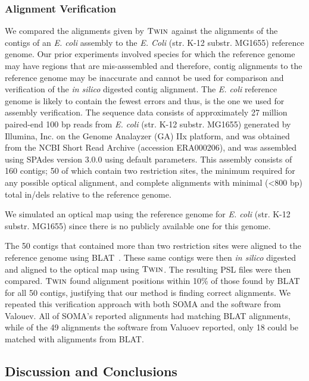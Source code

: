 \subsubsection{Alignment Verification}
\label{sec:ecoli-twin}

We compared the alignments given by $\mbox{\rm \textsc{Twin}}$ against the alignments of the contigs of an \emph{E. coli} assembly to the \emph{E. Coli} (str. K-12 substr. MG1655) reference genome.  Our prior experiments involved species for which the reference genome may have regions that are mis-asssembled and therefore, contig alignments to the reference genome may be inaccurate and cannot be used for comparison and verification of the \emph{in silico} digested contig alignment.   The \emph{E. coli} reference genome is likely to contain the fewest errors and thus, is the one we used for assembly verification.  The sequence data consists of approximately 27 million paired-end 100 bp reads from \emph{E. coli} (str. K-12 substr. MG1655) generated by Illumina, Inc. on the Genome Analayzer (GA) IIx platform, and  was obtained from the NCBI Short Read Archive (accession ERA000206), and was assembled using SPAdes version 3.0.0 \cite{spades} using default parameters.  This assembly consists of 160 contigs; 50 of which contain two restriction sites, the minimum required for any possible optical alignment, and complete alignments with minimal (\textless 800 bp) total in/dels relative to the reference genome.

We simulated an optical map using the reference genome for \emph{E. coli} (str. K-12 substr. MG1655) since there is no publicly available one for this genome.

The 50 contigs that contained more than two restriction sites were aligned to the reference genome using BLAT~\cite{blat}.  These same contigs were then \emph{in silico} digested and aligned to the optical map using $\mbox{\rm \textsc{Twin}}$.  The resulting PSL files were then compared.  $\mbox{\rm \textsc{Twin}}$ found alignment positions within 10\% of those found by BLAT for all 50 contigs, justifying that our method is finding correct alignments.  We repeated this verification approach with both SOMA and the software from Valouev.  All of SOMA's reported alignments had matching BLAT alignments, while of the 49 alignments the software from Valuoev reported, only 18 could be matched with alignments from BLAT.

\subsection{Discussion and Conclusions}
\label{sec-discussion}

